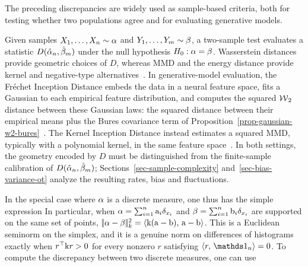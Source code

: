 The preceding discrepancies are widely used as sample-based criteria, both for testing whether two populations agree and for evaluating generative models.

\begin{example}\label{ex-two-sample-testing-fid}
	Given samples \(X_1,\ldots,X_n\sim\alpha\) and \(Y_1,\ldots,Y_m\sim\beta\), a two-sample test evaluates a statistic \(D(\hat{\alpha}_n,\hat{\beta}_m)\) under the null hypothesis \(H_0:\alpha=\beta\). Wasserstein distances provide geometric choices of \(D\), whereas MMD and the energy distance provide kernel and negative-type alternatives~\cite{ramdas2017wasserstein,gretton2012kernel,szekely2004testing}. In generative-model evaluation, the Fr\'echet Inception Distance embeds the data in a neural feature space, fits a Gaussian to each empirical feature distribution, and computes the squared \(\operatorname{\mathcal{W}}_2\) distance between these Gaussian laws: the squared distance between their empirical means plus the Bures covariance term of Proposition~\ref{prop-gaussian-w2-bures}~\cite{HeuselRamsauerUnterthinerNesslerHochreiter2017FID}. The Kernel Inception Distance instead estimates a squared MMD, typically with a polynomial kernel, in the same feature space~\cite{BinkowskiSutherlandArbelGretton2018MMDGAN}. In both settings, the geometry encoded by \(D\) must be distinguished from the finite-sample calibration of \(D(\hat{\alpha}_n,\hat{\beta}_m)\); Sections~\ref{sec-sample-complexity} and~\ref{sec-bias-variance-ot} analyze the resulting rates, bias and fluctuations.
\end{example}

In the special case where $\alpha$ is a discrete measure, one thus has the simple expression
In particular, when $\alpha=\sum_{i=1}^n \mathrm{a}_i \delta_{x_i}$ and $\beta=\sum_{i=1}^n \mathrm{b}_i \delta_{x_i}$ are supported on the same set of points, $|\!| \alpha-\beta |\!|_{k}^2 = \langle \mathrm{k}(\mathrm{a}-\mathrm{b}),\,\mathrm{a}-\mathrm{b}\rangle$. This is a Euclidean seminorm on the simplex, and it is a genuine norm on differences of histograms exactly when $r^\top\mathrm{k} r>0$ for every nonzero $r$ satisfying $\dotp{r}{\ones_n}=0$.
%
To compute the discrepancy between two discrete measures, one can use


